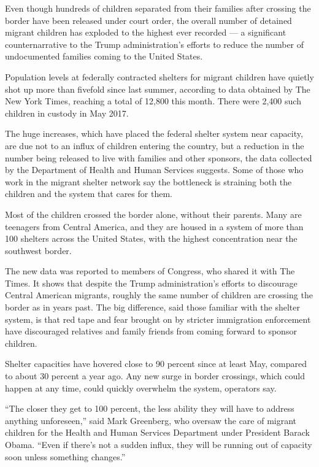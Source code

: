 Even though hundreds of children separated from their families after
crossing the border have been released under court order, the overall
number of detained migrant children has exploded to the highest ever
recorded --- a significant counternarrative to the Trump
administration's efforts to reduce the number of undocumented families
coming to the United States.

Population levels at federally contracted shelters for migrant children
have quietly shot up more than fivefold since last summer, according to
data obtained by The New York Times, reaching a total of 12,800 this
month. There were 2,400 such children in custody in May 2017.

The huge increases, which have placed the federal shelter system near
capacity, are due not to an influx of children entering the country, but
a reduction in the number being released to live with families and other
sponsors, the data collected by the Department of Health and Human
Services suggests. Some of those who work in the migrant shelter network
say the bottleneck is straining both the children and the system that
cares for them.

Most of the children crossed the border alone, without their parents.
Many are teenagers from Central America, and they are housed in a system
of more than 100 shelters across the United States, with the highest
concentration near the southwest border.

The new data was reported to members of Congress, who shared it with The
Times. It shows that despite the Trump administration's efforts to
discourage Central American migrants, roughly the same number of
children are crossing the border as in years past. The big difference,
said those familiar with the shelter system, is that red tape and fear
brought on by stricter immigration enforcement have discouraged
relatives and family friends from coming forward to sponsor children.

Shelter capacities have hovered close to 90 percent since at least May,
compared to about 30 percent a year ago. Any new surge in border
crossings, which could happen at any time, could quickly overwhelm the
system, operators say.

``The closer they get to 100 percent, the less ability they will have to
address anything unforeseen,'' said Mark Greenberg, who oversaw the care
of migrant children for the Health and Human Services Department under
President Barack Obama. ``Even if there's not a sudden influx, they will
be running out of capacity soon unless something changes.''


